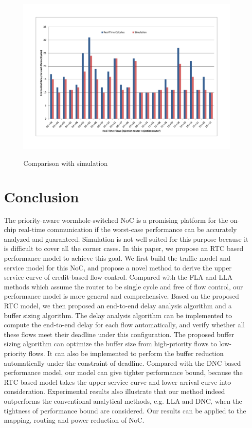 \documentclass[10pt,journal]{IEEEtran}
\begin{document}
\begin{figure}
  \centering
  \includegraphics[scale=0.65]{figures/ericsson.pdf}\\
  \caption{Comparison with simulation}\label{ericsson}
\end{figure}

\section{Conclusion}\label{conclusion}
The priority-aware wormhole-switched NoC is a promising platform for the on-chip real-time communication if the worst-case performance can be accurately analyzed and guaranteed. Simulation is not well suited for this purpose because it is difficult to cover all the corner cases. In this paper, we propose an RTC based performance model to achieve this goal. We first build the traffic model and service model for this NoC, and propose a novel method to derive the upper service curve of credit-based flow control. Compared with the FLA and LLA methods which assume the router to be single cycle and free of flow control, our performance model is more general and comprehensive. Based on the proposed RTC model, we then proposed an end-to-end delay analysis algorithm and a buffer sizing algorithm. The delay analysis algorithm can be implemented to compute the end-to-end delay for each flow automatically, and verify whether all these flows meet their deadline under this configuration. The proposed buffer sizing algorithm can optimize the buffer size from high-priority flows to low-priority flows. It can also be implemented to perform the buffer reduction automatically under the constraint of deadline. Compared with the DNC based performance model, our model can give tighter performance bound, because the RTC-based model takes the upper service curve and lower arrival curve into consideration. Experimental results also illustrate that our method indeed outperforms the conventional analytical methods, e.g. LLA and DNC, when the tightness of performance bound are considered. Our results can be applied to the mapping, routing and power reduction of NoC.
\end{document}

